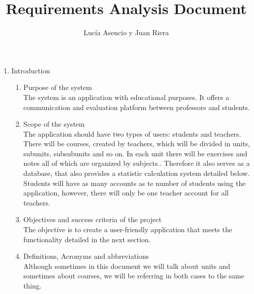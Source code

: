 \documentclass{article}
\title{Requirements Analysis Document}
\author{Lucía Asencio y Juan Riera}
\begin{document}
\maketitle
\begin{enumerate}
	\item{Introduction}
	\begin{enumerate}
		\item{Purpose of the system}
		\\The system is an application with educational purposes. It offers a communication and evaluation platform between professors and students.
		\item{Scope of the system}
		\\The application should have two types of users: students and teachers. There will be courses, created by teachers, which will be divided in units, subunits, subsubunits and so on. In each unit there will be exercises and notes all of which are organized by subjects.. Therefore it also serves as a database, that also provides a statistic calculation system detailed below.\\Students will have as many accounts as te number of students using the application, however, there will only be one teacher account for all teachers.
		\item{Objectives and success criteria of the project}
		\\The objective is to create a user-friendly application that meets the functionality detailed in the next section.
		\item{Definitions, Acronyms and abbreviations}
		\\Although sometimes in this document we will talk about units and sometimes about courses, we will be referring in both cases to the same thing.
	\end{enumerate}
	

\end{enumerate}
\end{document}
